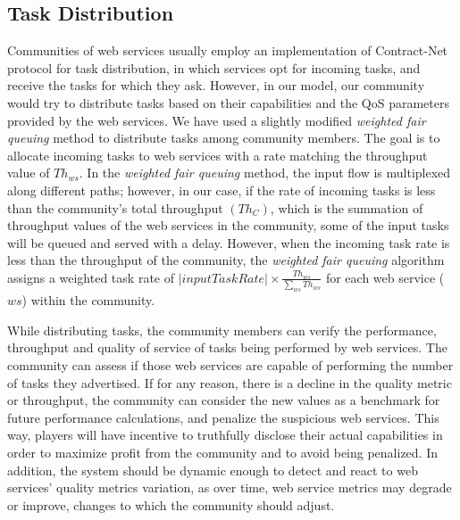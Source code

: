 \documentclass[10pt,journal,cspaper,compsoc]{IEEEtran}
\begin{document}
\subsection{Task Distribution}

Communities of web services usually employ an implementation of Contract-Net protocol for task distribution, in which services opt for incoming tasks, and receive the tasks for which they ask. However, in our model, our community would try to distribute tasks based on their capabilities and the QoS parameters provided by the web services. We have used a slightly modified \emph{weighted fair queuing} method to distribute tasks among community members. The goal is to allocate incoming tasks to web services with a rate matching the throughput value of $Th_{ws}$. In the \emph{weighted fair queuing} method, the input flow is multiplexed along different paths; however, in our case, if the rate of incoming tasks is less than the community's total throughput $(Th_{C})$, which is the summation of throughput values of the web services in the community, some of the input tasks will be queued and served with a delay. 
However, when the incoming task rate is less than the throughput of the community, the \emph{weighted fair queuing} algorithm assigns a weighted task rate of $|input Task Rate| \times \frac{Th_{ws}}{\sum_{ws}{Th_{ws}}}$ for each web service ($ws$) within the community.

While distributing tasks, the community members can verify the performance, throughput and quality of service of tasks being performed by web services. The community can assess if those web services are capable of performing the number of tasks they advertised. If for any reason, there is a decline in the quality metric or throughput, the community can consider the new values as a benchmark for future performance calculations, and penalize the suspicious web services. This way, players will have incentive to truthfully disclose their actual capabilities in order to maximize profit from the community and to avoid being penalized. In addition, the system should be dynamic enough to detect and react to web services' quality metrics variation, as over time, web service metrics may degrade or improve, changes to which the community should adjust.
\end{document}

